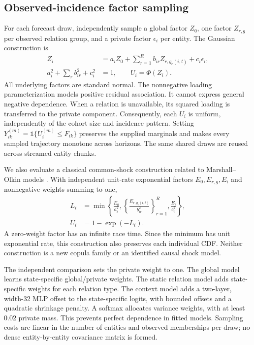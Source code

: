 \subsection{Observed-incidence factor sampling}
For each forecast draw, independently sample a global factor $Z_0$, one factor
$Z_{r,g}$ per observed relation group, and a private factor $\epsilon_i$ per
entity. The Gaussian construction is
\begin{equation}
 \begin{aligned}
 Z_i&=a_iZ_0+\sum_{r=1}^{R}b_{ir}Z_{r,g_r(i,t)}+c_i\epsilon_i,\\
 a_i^2+\sum_r b_{ir}^2+c_i^2&=1,\qquad U_i=\Phi(Z_i).
 \end{aligned}
\end{equation}
All underlying factors are standard normal. The nonnegative loading
parameterization models positive residual association. It cannot express
general negative dependence. When a relation is unavailable, its squared
loading is transferred to the private component. Consequently, each $U_i$ is
uniform, independently of the cohort size and incidence pattern. Setting
$Y_{ik}^{(m)}=\mathbb{1}\{U_i^{(m)}\leq F_{ik}\}$ preserves the supplied
marginals and makes every sampled trajectory monotone across horizons.
The same shared draws are reused across streamed entity chunks.

We also evaluate a classical common-shock construction related to
Marshall--Olkin models \citep{marshall1967}. With independent unit-rate
exponential factors $E_0,E_{r,g},E_i$ and nonnegative weights summing to one,
\begin{equation}
 \begin{aligned}
 L_i&=\min\left\{\frac{E_0}{a_i^2},
       \left\{\frac{E_{r,g_r(i,t)}}{b_{ir}^2}\right\}_{r=1}^{R},
       \frac{E_i}{c_i^2}\right\},\\
 U_i&=1-\exp(-L_i).
 \end{aligned}
\end{equation}
A zero-weight factor has an infinite race time. Since the minimum has unit
exponential rate, this construction also preserves each individual CDF. Neither
construction is a new copula family or an identified causal shock model.

The independent comparison sets the private weight to one. The global model
learns state-specific global/private weights. The static relation model adds
state-specific weights for each relation type. The context model adds a
two-layer, width-32 MLP offset to the state-specific logits, with bounded offsets
and a quadratic shrinkage penalty. A softmax allocates variance weights, with
at least $0.02$ private mass. This prevents perfect dependence in fitted models.
Sampling costs are linear in the number of entities and observed memberships
per draw; no dense entity-by-entity covariance matrix is formed.

